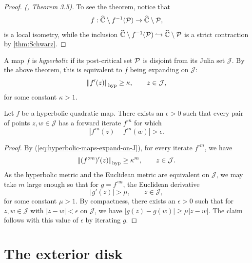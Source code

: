  \begin{proof}[Proof. (\cite{mcmullen_1994}, Theorem 3.5)]
	To see the theorem, notice that
	$$f: \widehat {\mathbb C} \setminus  f^{-1}(\operatorname{\mathcal P}) \to \widehat {\mathbb C} \setminus \operatorname{\mathcal P},
	$$
	is a local isometry, while the  inclusion 
	$\widehat {\mathbb C} \setminus f^{-1}(\operatorname{\mathcal P}) \xhookrightarrow{} 
	\widehat {\mathbb C} \setminus \operatorname{\mathcal P}$ is a strict contraction by  \cref{thm:Schwarz}.
 \end{proof}
	 
A map $f$ is \emph{hyperbolic} if
 its post-critical set $\operatorname{\mathcal P}$ is disjoint from its Julia set $\mathcal J$.
 By the above theorem, this is equivalent to $f$ being expanding on $\mathcal J$:
	\begin{equation}
	\label{eq:hyperbolic-maps-expand-on-J}
		\left\Vert f'(z)\right\Vert_{\operatorname{hyp}} \geq \kappa, \qquad z \in \mathcal J,
	\end{equation} 
 for some constant $\kappa >1$.
 
 \begin{corollary} \label{elevator for points on julia}
	Let $f$ be a hyperbolic quadratic map.
	There exists an $\epsilon > 0$ such that 
	every pair of points $z,w\in\mathcal{J}$
	 has a forward iterate $f^{\circ n}$ for which 
	 \begin{equation*}
		|f^{\circ n}(z)-f^{\circ n}(w)|>\epsilon.	
	 \end{equation*}
\end{corollary}

\begin{proof}	
	By (\ref{eq:hyperbolic-maps-expand-on-J}), for every iterate $f^{\circ m}$, we have
	\begin{equation}
		\left\Vert (f^{\circ m})'(z)\right\Vert_{\operatorname{hyp}} \geq \kappa^m, \qquad z \in \mathcal J.
	\end{equation} 
	As the hyperbolic metric and the Euclidean metric are equivalent on $\mathcal J$,
	we may take $m$ large enough so that for $g=f^{\circ m}$, the Euclidean derivative
	$$|g'(z)| > \mu, \qquad z \in \mathcal J,$$
	 for some constant $\mu  > 1$. 
	By compactness, there exists an $\epsilon>0$ such that for $z, w \in \mathcal J$ with $|z-w| < \epsilon$ on $\mathcal J$,
	we have $|g(z)-g(w)| \geq \mu |z-w|$. The claim follows with this value of $\epsilon$ by iterating $g$.
\end{proof}

\section{The exterior disk}

